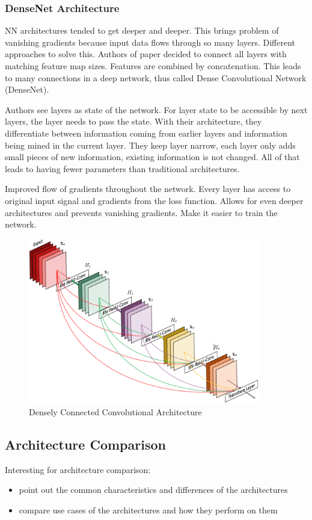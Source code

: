 \subsubsection{DenseNet Architecture}
\cite{densenet18}
NN architectures tended to get deeper and deeper. This brings problem of vanishing gradients because input data flows through so many layers. Different approaches to solve this. Authors of paper decided to connect all layers with matching feature map sizes. Features are combined by concatenation. This leads to many connections in a deep network, thus called Dense Convolutional Network (DenseNet).

Authors see layers as state of the network. For layer state to be accessible by next layers, the layer needs to pass the state. With their architecture, they differentiate between information coming from earlier layers and information being mined in the current layer. They keep layer narrow, each layer only adds small pieces of new information, existing information is not changed. All of that leads to having fewer parameters than traditional architectures.

Improved flow of gradients throughout the network. Every layer has access to original input signal and gradients from the loss function. Allows for even deeper architectures and prevents vanishing gradients. Make it easier to train the network.


\begin{figure}[h]
    \centering
    \includegraphics[width=0.9\textwidth]{images/dense-net-architecture}
    \caption{Densely Connected Convolutional Architecture \cite{densenet18}}
    \label{fig:densenet_architecture}
\end{figure}

\subsection{Architecture Comparison}
Interesting for architecture comparison: \cite{imseg_architecures}

\begin{itemize}
    \item point out the common characteristics and differences of the architectures
    \item compare use cases of the architectures and how they perform on them
\end{itemize}

\newpage